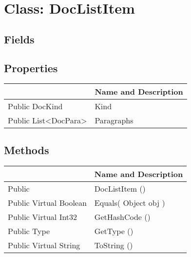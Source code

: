 \documentclass[11pt, oneside, a4paper]{book}
\begin{document}
\hypertarget{SoftwareEngineeringTools.{}Documentation.{}DocListItem}{}
\section{Class: DocListItem}

\subsection{Fields}

\subsection{Properties}
\begin{center}
\begin{tabular}{| p{3cm} | p{12cm} | }
\hline
\textbf{ } & \textbf{ Name and Description}\\
\hline
 Public  DocKind &  Kind\hypertarget{SoftwareEngineeringTools.{}Documentation.{}DocListItem.{}Kind}{}\\
\hline
 Public  List<DocPara> &  Paragraphs\hypertarget{SoftwareEngineeringTools.{}Documentation.{}DocListItem.{}Paragraphs}{}\\
\hline
\end{tabular}
\end{center}

\subsection{Methods}
\begin{center}
\begin{tabular}{| p{3cm} | p{12cm} | }
\hline
\textbf{ } & \textbf{ Name and Description}\\
\hline
 Public  &  DocListItem ()\hypertarget{SoftwareEngineeringTools.{}Documentation.{}DocListItem.{}DocListItem}{}\\
\hline
 Public  Virtual  Boolean &  Equals(\hypertarget{SoftwareEngineeringTools.{}Documentation.{}DocListItem.{}Equals\_Object}{} Object  obj  )\\
\hline
 Public  Virtual  Int32 &  GetHashCode ()\hypertarget{SoftwareEngineeringTools.{}Documentation.{}DocListItem.{}GetHashCode}{}\\
\hline
 Public  Type &  GetType ()\hypertarget{SoftwareEngineeringTools.{}Documentation.{}DocListItem.{}GetType}{}\\
\hline
 Public  Virtual  String &  ToString ()\hypertarget{SoftwareEngineeringTools.{}Documentation.{}DocListItem.{}ToString}{}\\
\hline
\end{tabular}
\end{center}
 
\end{document}
